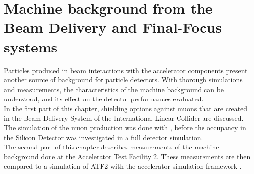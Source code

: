 \chapter{Machine background from the Beam Delivery and Final-Focus systems}
\label{machine_bkg}

\begin{chapterabstract}
 Particles produced in beam interactions with the accelerator components present another source of background for particle detectors.
 With thorough simulations and measurements,  the characteristics of the machine background can be understood, and its effect on the detector performances evaluated.
 \\In the first part of this chapter, shielding options against muons that are created in the Beam Delivery System of the International Linear Collider are discussed.
 The simulation of the muon production was done with \mucarlo, before the occupancy in the Silicon Detector was investigated in a full detector simulation.
 \\The second part of this chapter describes measurements of the machine background done at the Accelerator Test Facility 2.
 These measurements are then compared to a simulation of ATF2 with the accelerator simulation framework \bdsim.
\end{chapterabstract}

